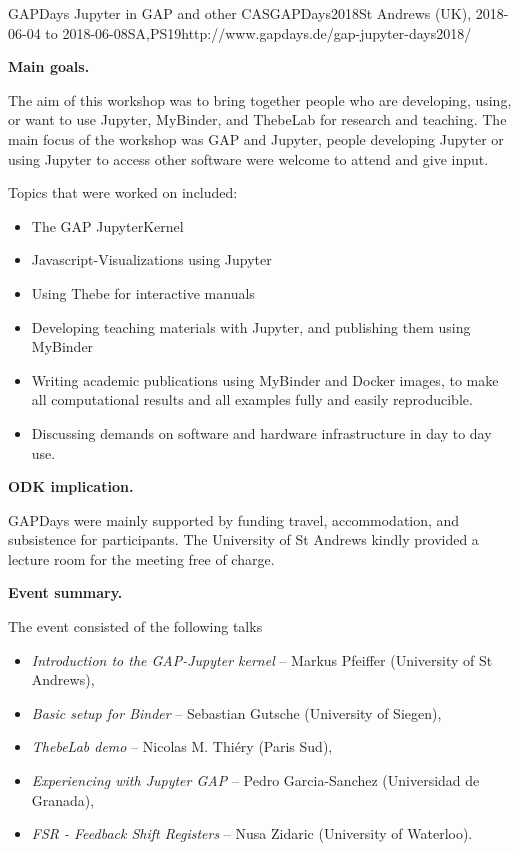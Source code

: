 \begin{event}{GAPDays Jupyter in GAP and other CAS}{GAPDays2018}{St Andrews (UK),
2018-06-04 to 2018-06-08}{SA,PS}{19}{http://www.gapdays.de/gap-jupyter-days2018/}


\textbf{Main goals.}

The aim of this workshop was to bring together people who are developing, using,
or want to use Jupyter, MyBinder, and ThebeLab for research and teaching. The
main focus of the workshop was GAP and Jupyter, people developing Jupyter or
using Jupyter to access other software were welcome to attend and give input.

Topics that were worked on included:

\begin{itemize}
\item The GAP JupyterKernel
\item Javascript-Visualizations using Jupyter
\item Using Thebe for interactive manuals
\item Developing teaching materials with Jupyter, and publishing them using MyBinder
\item Writing academic publications using MyBinder and Docker images, to make
  all computational results and all examples fully and easily reproducible.
\item Discussing demands on software and hardware infrastructure in day to day
  use.
\end{itemize}

\textbf{ODK implication.} 

GAPDays were mainly supported by \ODK funding travel, accommodation, and subsistence
for participants. The University of St Andrews kindly provided a lecture room
for the meeting free of charge.

\textbf{Event summary.} 

The event consisted of the following talks
\begin{itemize}
\item \emph{Introduction to the GAP-Jupyter kernel} -- Markus Pfeiffer (University of St Andrews),
\item \emph{Basic setup for Binder} -- Sebastian Gutsche (University of Siegen),
\item \emph{ThebeLab demo} -- Nicolas M. Thiéry (Paris Sud),
\item \emph{Experiencing with Jupyter GAP} -- Pedro Garcia-Sanchez (Universidad de Granada),
\item \emph{FSR - Feedback Shift Registers} -- Nusa Zidaric (University of Waterloo).
\end{itemize}


\end{event}
